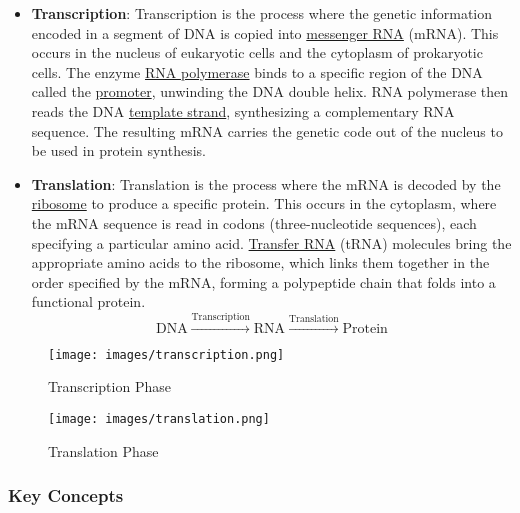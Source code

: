 \documentclass[a4paper]{article}
\begin{document}
\begin{itemize}
  \item \textbf{Transcription}: Transcription is the process where the genetic 
  information encoded in a segment of DNA is copied into \underline{messenger RNA}
   (mRNA). This occurs in the nucleus of eukaryotic cells and the 
   cytoplasm of prokaryotic cells. 
   The enzyme \underline{RNA polymerase} binds to a specific region of the 
   DNA called the \underline{promoter}, unwinding the DNA double helix. 
   RNA polymerase then reads the DNA \underline{template strand}, synthesizing 
   a complementary RNA sequence. The resulting mRNA carries the genetic code out 
   of the nucleus to be used in protein synthesis. 
   \item \textbf{Translation}: Translation is the process where the mRNA is 
   decoded by the \underline{ribosome} to produce a specific protein. 
   This occurs in the cytoplasm, where the mRNA sequence is read in codons 
   (three-nucleotide sequences), each specifying a particular amino acid. 
   \underline{Transfer RNA} (tRNA) molecules bring the appropriate amino acids 
   to the ribosome, which links them together in the order specified by the 
   mRNA, forming a polypeptide chain that folds into a functional protein. 
  \[
  \text{DNA} \xrightarrow{\text{Transcription}} \text{RNA} \xrightarrow{\text{Translation}} \text{Protein}
  \]
\end{itemize}

\begin{figure}[H]
  \centering
  \texttt{[image: images/transcription.png]}
  \caption{Transcription Phase}
\end{figure}
\begin{figure}[H]
  \centering
  \texttt{[image: images/translation.png]}
  \caption{Translation Phase}
\end{figure}

\subsubsection*{Key Concepts}
\end{document}
